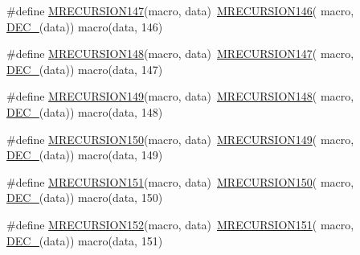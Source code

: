 \begin{DoxyCompactItemize}
\item 
\#define \mbox{\hyperlink{group__group__sam0__utils__mrecursion_ga30a38947003689daf96eaf919fa90bbf}{M\+R\+E\+C\+U\+R\+S\+I\+O\+N147}}(macro,  data)~\mbox{\hyperlink{group__group__sam0__utils__mrecursion_ga266f741d92739be1a64e16447fe11eca}{M\+R\+E\+C\+U\+R\+S\+I\+O\+N146}}(  macro, \mbox{\hyperlink{group__group__sam0__utils__mrecursion_ga1d23d683797679dca8c3512a54a5dcae}{D\+E\+C\+\_\+}}(data))   macro(data, 146)
\item 
\#define \mbox{\hyperlink{group__group__sam0__utils__mrecursion_ga2bcf729fdb108d8f8cf420b07388906d}{M\+R\+E\+C\+U\+R\+S\+I\+O\+N148}}(macro,  data)~\mbox{\hyperlink{group__group__sam0__utils__mrecursion_ga30a38947003689daf96eaf919fa90bbf}{M\+R\+E\+C\+U\+R\+S\+I\+O\+N147}}(  macro, \mbox{\hyperlink{group__group__sam0__utils__mrecursion_ga1d23d683797679dca8c3512a54a5dcae}{D\+E\+C\+\_\+}}(data))   macro(data, 147)
\item 
\#define \mbox{\hyperlink{group__group__sam0__utils__mrecursion_ga6d1a3c19222c7ee8771101e98a959fb7}{M\+R\+E\+C\+U\+R\+S\+I\+O\+N149}}(macro,  data)~\mbox{\hyperlink{group__group__sam0__utils__mrecursion_ga2bcf729fdb108d8f8cf420b07388906d}{M\+R\+E\+C\+U\+R\+S\+I\+O\+N148}}(  macro, \mbox{\hyperlink{group__group__sam0__utils__mrecursion_ga1d23d683797679dca8c3512a54a5dcae}{D\+E\+C\+\_\+}}(data))   macro(data, 148)
\item 
\#define \mbox{\hyperlink{group__group__sam0__utils__mrecursion_gabb9799f7a5fef3fb5fa69e1bef4ff318}{M\+R\+E\+C\+U\+R\+S\+I\+O\+N150}}(macro,  data)~\mbox{\hyperlink{group__group__sam0__utils__mrecursion_ga6d1a3c19222c7ee8771101e98a959fb7}{M\+R\+E\+C\+U\+R\+S\+I\+O\+N149}}(  macro, \mbox{\hyperlink{group__group__sam0__utils__mrecursion_ga1d23d683797679dca8c3512a54a5dcae}{D\+E\+C\+\_\+}}(data))   macro(data, 149)
\item 
\#define \mbox{\hyperlink{group__group__sam0__utils__mrecursion_gafbbfc4f5157baa8750ce7782323a9f5a}{M\+R\+E\+C\+U\+R\+S\+I\+O\+N151}}(macro,  data)~\mbox{\hyperlink{group__group__sam0__utils__mrecursion_gabb9799f7a5fef3fb5fa69e1bef4ff318}{M\+R\+E\+C\+U\+R\+S\+I\+O\+N150}}(  macro, \mbox{\hyperlink{group__group__sam0__utils__mrecursion_ga1d23d683797679dca8c3512a54a5dcae}{D\+E\+C\+\_\+}}(data))   macro(data, 150)
\item 
\#define \mbox{\hyperlink{group__group__sam0__utils__mrecursion_ga06ffc91df193dcdab63b568718773b02}{M\+R\+E\+C\+U\+R\+S\+I\+O\+N152}}(macro,  data)~\mbox{\hyperlink{group__group__sam0__utils__mrecursion_gafbbfc4f5157baa8750ce7782323a9f5a}{M\+R\+E\+C\+U\+R\+S\+I\+O\+N151}}(  macro, \mbox{\hyperlink{group__group__sam0__utils__mrecursion_ga1d23d683797679dca8c3512a54a5dcae}{D\+E\+C\+\_\+}}(data))   macro(data, 151)

\end{DoxyCompactItemize}
